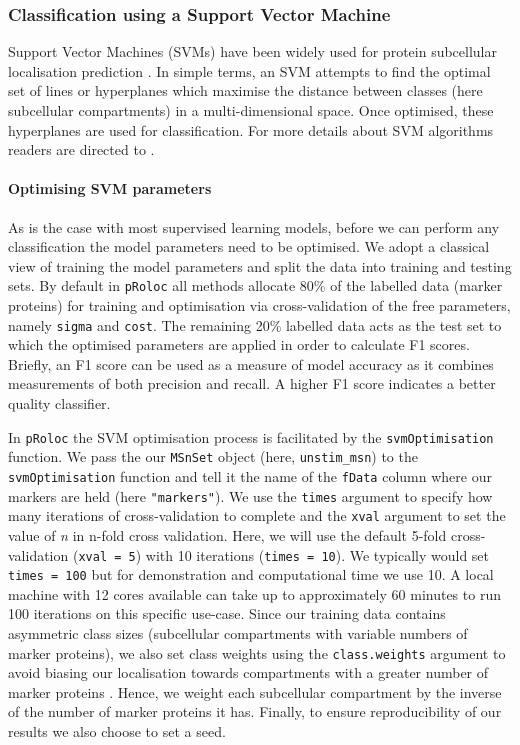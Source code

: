 \documentclass[9pt,a4paper,]{extarticle}
\begin{document}
\subsubsection{Classification using a Support Vector Machine}\label{classification-using-a-support-vector-machine}

Support Vector Machines (SVMs) have been widely used for protein subcellular
localisation prediction \citep{Itzhak2016, Orre2019, Christoforou2016, Geladaki2019, Mulvey2017, Schessner2023}.
In simple terms, an SVM attempts to find the optimal set of lines or hyperplanes
which maximise the distance between classes (here subcellular compartments) in a
multi-dimensional space. Once optimised, these hyperplanes are used for
classification. For more details about SVM algorithms readers are directed to \citep{Noble2006}.

\paragraph{Optimising SVM parameters}\label{optimising-svm-parameters}

As is the case with most supervised learning models, before we can perform any
classification the model parameters need to be optimised. We adopt a classical
view of training the model parameters and split the data into training and
testing sets. By default in \texttt{pRoloc} all methods allocate 80\% of the labelled
data (marker proteins) for training and optimisation via cross-validation of the
free parameters, namely \texttt{sigma} and \texttt{cost}. The remaining 20\% labelled data acts
as the test set to which the optimised parameters are applied in order to
calculate F1 scores. Briefly, an F1 score can be used as a measure of model
accuracy as it combines measurements of both precision and recall. A higher F1
score indicates a better quality classifier.

In \texttt{pRoloc} the SVM optimisation process is facilitated by the \texttt{svmOptimisation}
function. We pass the our \texttt{MSnSet} object (here, \texttt{unstim\_msn}) to the
\texttt{svmOptimisation} function and tell it the name of the \texttt{fData} column where our
markers are held (here \texttt{"markers"}). We use the \texttt{times} argument to specify how
many iterations of cross-validation to complete and the \texttt{xval} argument to set
the value of \emph{n} in n-fold cross validation. Here, we will use the default
5-fold cross-validation (\texttt{xval\ =\ 5}) with 10 iterations (\texttt{times\ =\ 10}). We
typically would set \texttt{times\ =\ 100} but for demonstration and computational time
we use 10. A local machine with 12 cores available can take up to approximately
60 minutes to run 100 iterations on this specific use-case. Since our training data
contains asymmetric class sizes (subcellular compartments with variable numbers
of marker proteins), we also set class weights using the \texttt{class.weights}
argument to avoid biasing our localisation towards compartments with a greater
number of marker proteins \citep{YiMinHuang2005}. Hence, we weight each subcellular
compartment by the inverse of the number of marker proteins it has. Finally, to
ensure reproducibility of our results we also choose to set a seed.
\end{document}
